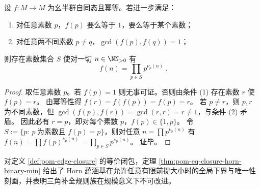\begin{corollary}[正交素数寄存器下的删轴刻画]\label{cor:pom-orthogonal-idempotent-delete-primes}
设 \(f:M\to M\) 为幺半群自同态且幂等。若进一步满足：
\begin{enumerate}
  \item 对任意素数 \(p\)，\(f(p)\) 要么等于 \(1\)，要么等于某个素数；
  \item 对任意两不同素数 \(p\ne q\)，\(\gcd(f(p),f(q))=1\)；
\end{enumerate}
则存在素数集合 \(S\) 使对一切 \(n\in\NN_{>0}\) 有
\[
\boxed{\;
f(n)=\prod_{p\in S}p^{\nu_p(n)}\; }.
\]
\end{corollary}
\begin{proof}
取任意素数 \(p\)。若 \(f(p)=1\) 则无事可证。否则由条件 (1) 存在素数 \(r\) 使 \(f(p)=r\)。
由幂等性得 \(f(r)=f(f(p))=f(p)=r\)。
若 \(p\ne r\)，则 \(p,r\) 为不同素数，但
\(
\gcd(f(p),f(r))=\gcd(r,r)=r\ne 1
\)，与条件 (2) 矛盾。
因此必有 \(r=p\)，即对每个素数 \(p\)，\(f(p)\in\{1,p\}\)。
令 \(S:=\{p:\ p\ \text{为素数且 }f(p)=p\}\)，则对任意 \(n=\prod p^{\nu_p(n)}\) 有
\(
f(n)=\prod f(p)^{\nu_p(n)}=\prod_{p\in S}p^{\nu_p(n)}
\)。
证毕。
\end{proof}

\begin{remark}\label{rem:pom-horn-basis-global-min}
对定义 \ref{def:pom-edge-closure} 的等价闭包，定理 \ref{thm:pom-eq-closure-horn-binary-min} 给出了 Horn 蕴涵基在允许任意有限前提大小时的全局下界与唯一性刻画，并表明三角补全规则族在规模意义下不可改进。
\end{remark}

\endinput
